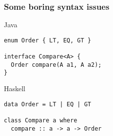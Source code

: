 \begin{frame}[fragile]
\frametitle{Some boring syntax issues}
\begin{block}{Java}
\begin{lstlisting}[style=java]
enum Order { LT, EQ, GT }

interface Compare<A> {
  Order compare(A a1, A a2);
}
\end{lstlisting}
\end{block}
\begin{block}{Haskell}
\begin{lstlisting}[style=haskell]
data Order = LT | EQ | GT

class Compare a where
  compare :: a -> a -> Order
\end{lstlisting}
\end{block}
\end{frame}